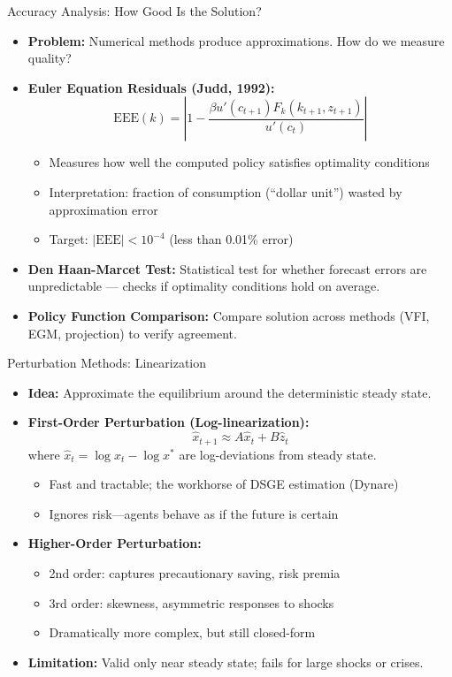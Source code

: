 \begin{frame}{Accuracy Analysis: How Good Is the Solution?}
\begin{itemize}
\item \textbf{Problem:} Numerical methods produce approximations. How do we measure quality?

\medskip
\item \textbf{Euler Equation Residuals (Judd, 1992):}
\[
\text{EEE}(k) = \left| 1 - \frac{\beta u'(c_{t+1}) F_k(k_{t+1}, z_{t+1})}{u'(c_t)} \right|
\]
\begin{itemize}
    \item Measures how well the computed policy satisfies optimality conditions
    \item Interpretation: fraction of consumption (``dollar unit'') wasted by approximation error
    \item Target: $|\text{EEE}| < 10^{-4}$ (less than 0.01\% error)
\end{itemize}

\medskip
\item \textbf{Den Haan-Marcet Test:} Statistical test for whether forecast errors are unpredictable --- checks if optimality conditions hold on average.

\medskip
\item \textbf{Policy Function Comparison:} Compare solution across methods (VFI, EGM, projection) to verify agreement.
\end{itemize}
\end{frame}

\begin{frame}{Perturbation Methods: Linearization}
\begin{itemize}
\item \textbf{Idea:} Approximate the equilibrium around the deterministic steady state.

\medskip
\item \textbf{First-Order Perturbation (Log-linearization):}
\[
\hat{x}_{t+1} \approx A \hat{x}_t + B \hat{z}_t
\]
where $\hat{x}_t = \log x_t - \log x^*$ are log-deviations from steady state.
\begin{itemize}
    \item Fast and tractable; the workhorse of DSGE estimation (Dynare)
    \item Ignores risk---agents behave as if the future is certain
\end{itemize}

\medskip
\item \textbf{Higher-Order Perturbation:}
\begin{itemize}
    \item 2nd order: captures precautionary saving, risk premia
    \item 3rd order: skewness, asymmetric responses to shocks
    \item Dramatically more complex, but still closed-form
\end{itemize}

\medskip
\item \textbf{Limitation:} Valid only near steady state; fails for large shocks or crises.
\end{itemize}
\end{frame}

